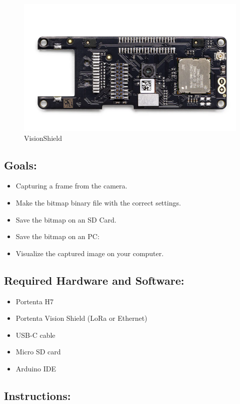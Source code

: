 \begin{figure}
	\begin{center}
		\includegraphics[width=0.7\linewidth]{Images/VisionShield/VisionShield.png}
		\caption{VisionShield}
		\label{VisionShield}
	\end{center}
\end{figure}

\subsection{Goals:}
\begin{itemize}
	\item Capturing a frame from the camera.
	\item Make the bitmap binary file with the correct settings.
	\item Save the bitmap on an SD Card.
	\item Save the bitmap on an PC: 
	\item Visualize the captured image on your computer. \cite{portentaCameraToBitmap:2024}
\end{itemize}

\subsection{Required Hardware and Software:}
\begin{itemize}
	\item Portenta H7
	\item Portenta Vision Shield (LoRa or Ethernet)
	\item USB-C cable
	\item Micro SD card
	\item Arduino IDE \cite{portentaCameraToBitmap:2024}
\end{itemize}

\subsection{Instructions:}

